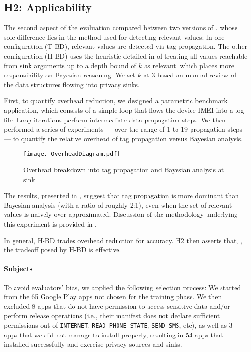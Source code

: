 \subsection{H2: Applicability}\label{Se:practical}
The second aspect of the evaluation compared between two versions of \Tool, whose sole difference lies in the method used for detecting relevant values: In one configuration (T-BD), relevant values are detected via tag propagation. The other configuration (H-BD) uses the heuristic detailed in  of treating all values reachable from sink arguments  up to a depth bound of $k$ as relevant, which places more responsibility on Bayesian reasoning. We set $k$ at 3 based on manual review of the data structures flowing into privacy sinks. 

 {First, to quantify overhead reduction, we designed a parametric benchmark application, which }
consists of a simple loop that flows the device IMEI into a log file.
Loop iterations perform intermediate data propagation steps. We then performed a series of experiments --- over the range of 1 to 19 propagation steps --- to quantify the relative overhead of tag propagation versus Bayesian analysis.

\begin{figure}
\texttt{[image: OverheadDiagram.pdf]}
\caption{\label{Fi:overhead}Overhead breakdown into tag propagation and Bayesian analysis at sink}
\end{figure}

The results, presented in , suggest that  tag propagation is more dominant than  Bayesian analysis (with a ratio of roughly 2:1), even when the set of relevant values is naively over approximated. Discussion of the methodology underlying this experiment is provided in .

In general, H-BD trades overhead reduction for accuracy. 
H2 then asserts that, , the tradeoff posed by H-BD is effective. 

\paragraph{Subjects} To avoid evaluators' bias, we applied the following selection process: We started from the 65 Google Play apps not chosen for the training phase. We then excluded 8 apps that do not have permission to access sensitive data and/or perform release operations (i.e., their manifest does not declare sufficient permissions out of {\tt INTERNET}, {\tt READ\_PHONE\_STATE}, {\tt SEND\_SMS}, etc), as well as 3 apps that we did not manage to install properly, resulting in 54 apps that installed successfully and exercise privacy sources and sinks.

